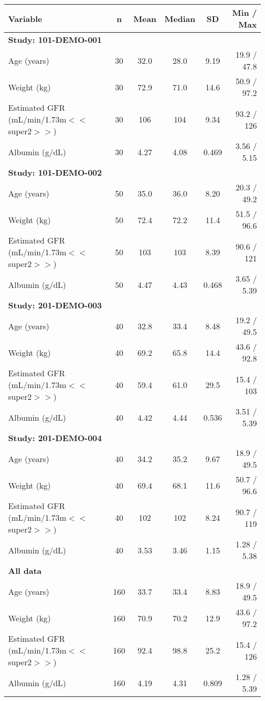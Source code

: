 \setlength{\tabcolsep}{5pt} 
\begin{threeparttable}
\renewcommand{\arraystretch}{1.3}
\begin{tabular}[h]{lccccr}
\hline
Variable & n & Mean & Median & SD & Min / Max \\
\hline
\multicolumn{6}{l}{\textbf{Study: 101-DEMO-001}}\\%
Age (years) & 30 & 32.0 & 28.0 & 9.19 & 19.9 / 47.8 \\
Weight (kg) & 30 & 72.9 & 71.0 & 14.6 & 50.9 / 97.2 \\
Estimated GFR (mL/min/1.73m$<$$<$super2$>$$>$) & 30 & 106 & 104 & 9.34 & 93.2 / 126 \\
Albumin (g/dL) & 30 & 4.27 & 4.08 & 0.469 & 3.56 / 5.15 \\
\hline \multicolumn{6}{l}{\textbf{Study: 101-DEMO-002}}\\%
Age (years) & 50 & 35.0 & 36.0 & 8.20 & 20.3 / 49.2 \\
Weight (kg) & 50 & 72.4 & 72.2 & 11.4 & 51.5 / 96.6 \\
Estimated GFR (mL/min/1.73m$<$$<$super2$>$$>$) & 50 & 103 & 103 & 8.39 & 90.6 / 121 \\
Albumin (g/dL) & 50 & 4.47 & 4.43 & 0.468 & 3.65 / 5.39 \\
\hline \multicolumn{6}{l}{\textbf{Study: 201-DEMO-003}}\\%
Age (years) & 40 & 32.8 & 33.4 & 8.48 & 19.2 / 49.5 \\
Weight (kg) & 40 & 69.2 & 65.8 & 14.4 & 43.6 / 92.8 \\
Estimated GFR (mL/min/1.73m$<$$<$super2$>$$>$) & 40 & 59.4 & 61.0 & 29.5 & 15.4 / 103 \\
Albumin (g/dL) & 40 & 4.42 & 4.44 & 0.536 & 3.51 / 5.39 \\
\hline \multicolumn{6}{l}{\textbf{Study: 201-DEMO-004}}\\%
Age (years) & 40 & 34.2 & 35.2 & 9.67 & 18.9 / 49.5 \\
Weight (kg) & 40 & 69.4 & 68.1 & 11.6 & 50.7 / 96.6 \\
Estimated GFR (mL/min/1.73m$<$$<$super2$>$$>$) & 40 & 102 & 102 & 8.24 & 90.7 / 119 \\
Albumin (g/dL) & 40 & 3.53 & 3.46 & 1.15 & 1.28 / 5.38 \\
\hline \multicolumn{6}{l}{\textbf{All data}}\\%
Age (years) & 160 & 33.7 & 33.4 & 8.83 & 18.9 / 49.5 \\
Weight (kg) & 160 & 70.9 & 70.2 & 12.9 & 43.6 / 97.2 \\
Estimated GFR (mL/min/1.73m$<$$<$super2$>$$>$) & 160 & 92.4 & 98.8 & 25.2 & 15.4 / 126 \\
Albumin (g/dL) & 160 & 4.19 & 4.31 & 0.809 & 1.28 / 5.39 \\
\hline
\end{tabular}
\end{threeparttable}
 
